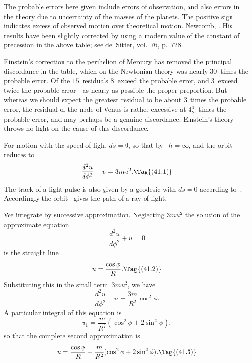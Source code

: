 \documentclass[12pt]{book}
\begin{document}
The probable errors here given include errors of observation, and also errors
in the theory due to uncertainty of the masses of the planets. The positive
sign indicates excess of observed motion over theoretical motion\footnotemark.\footnotetext
  {Newcomb, . His results have been slightly corrected by using a
  modern value of the constant of precession in the above table; see de~Sitter, 
  vol.~76, p.~728.}

Einstein's correction to the perihelion of Mercury has removed the principal
discordance in the table, which on the Newtonian theory was nearly $30$~times
the probable error. Of the $15$~residuals $8$~exceed the probable error,
and $3$~exceed twice the probable error---as nearly as possible the proper proportion.
But whereas we should expect the greatest residual to be about $3$~times
the probable error, the residual of the node of Venus is rather excessive
at $4\frac{1}{2}$~times the probable error, and may perhaps be a genuine discordance.
Einstein's theory throws no light on the cause of this discordance.

%
%

For motion with the speed of light $ds = 0$, so that by~ $h = \infty$, and
the orbit~ reduces to
\[
\frac{d^{2}u}{d\phi^{2}} + u = 3mu^2.
\Tag{(41.1)}
\]
The track of a light-pulse is also given by a geodesic with $ds = 0$ according to~.
Accordingly the orbit~ gives the path of a ray of light.

We integrate by successive approximation. Neglecting $3mu^2$ the solution
of the approximate equation
\[
\frac{d^{2}u}{d\phi^{2}} + u = 0
\]
is the straight line
\[
u = \frac{\cos\phi}{R}.
\Tag{(41.2)}
\]
Substituting this in the small term~$3mu^2$, we have
\[
\frac{d^{2}u}{d\phi^{2}} + u = \frac{3m}{R^{2}} \cos^{2}\phi.
\]
A particular integral of this equation is
\[
u_{1} = \frac{m}{R^{2}} (\cos^{2}\phi + 2\sin^{2}\phi),
\]
so that the complete second approximation is
\[
u = \frac{\cos\phi}{R} + \frac{m}{R^{2}} (\cos^{2}\phi + 2\sin^{2}\phi).
\Tag{(41.3)}
\]
\end{document}
